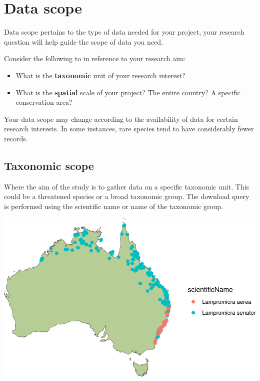\documentclass[
  letterpaper,
  DIV=11,
  numbers=noendperiod,
  oneside]{scrreprt}
\providecommand{\tightlist}{%
  \setlength{\itemsep}{0pt}\setlength{\parskip}{0pt}}\usepackage{longtable,booktabs,array}
\begin{document}

\hypertarget{data-scope}{%
\chapter{Data scope}\label{data-scope}}

Data scope pertains to the type of data needed for your project, your
research question will help guide the scope of data you need.

Consider the following to in reference to your research aim:

\begin{itemize}
\tightlist
\item
  What is the \textbf{taxonomic} unit of your research interest?
\item
  What is the \textbf{spatial} scale of your project? The entire
  country? A specific conservation area?
\end{itemize}

Your data scope may change according to the availability of data for
certain research interests. In some instances, rare species tend to have
considerably fewer records.

\hypertarget{taxonomic-scope}{%
\section{Taxonomic scope}\label{taxonomic-scope}}

Where the aim of the study is to gather data on a specific taxonomic
unit. This could be a threatened species or a broad taxonomic group. The
download query is performed using the scientific name or name of the
taxonomic group.

\includegraphics{scope_files/figure-pdf/unnamed-chunk-1-1.pdf}
\end{document}
